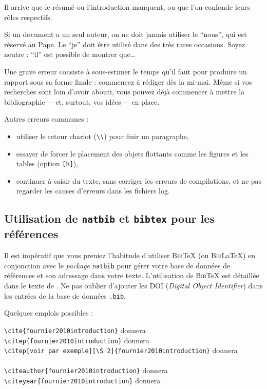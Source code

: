 \documentclass{ipgpmaster}
\begin{document}
Il arrive que le résumé ou l'introduction manquent, ou que l'on confonde 
leurs rôles respectifs.     

Si un document a un seul auteur, on ne doit jamais utiliser le ``nous'',  
qui est réservé au Pape. Le ``je'' doit être utilisé dans des très 
rares occasions. Soyez neutre : ``il'' est possible de montrer que\dots 

Une grave erreur consiste à sous-estimer le temps qu'il faut pour
 produire un rapport sous sa forme finale : commencez à rédiger dès la mi-mai.
Même si vos recherches sont loin d'avoir abouti, vous pouvez déjà commencer
 à mettre la bibliographie ---\,et, surtout, vos idées\,--- en place.
 
 
 Autres erreurs communes :
\begin{itemize}
\item utiliser le retour chariot (\verb"\\") pour finir un paragraphe,
\item essayer de forcer le placement des objets flottants comme les figures et les tables (option \verb"[h]"),
\item continuer à saisir du texte, sans corriger les erreurs de compilations, et ne pas regarder les causes d'erreurs dans les fichiers log.
\end{itemize}



\subsection{Utilisation de \texttt{natbib} et \texttt{bibtex} pour les références}
\label{sec:natbib}
Il est impératif que vous preniez l'habitude d'utiliser \textsc{Bib}\TeX{} (ou \textsc{Bib}\LaTeX{})
en conjonction avec le \textit{package\/} \texttt{natbib} pour gérer votre
 base de données de références et son adressage dans votre texte. L'utilisation de \textsc{Bib}\TeX{} 
est 
 détaillée dans le texte de \cite{moguilny2021introduction}. Ne pas oublier d'ajouter les DOI 
 (\textit{Digital Object Identifier}) dans les entrées de la base de données \texttt{.bib}.

 Quelques emplois possibles :

 \verb"\cite{fournier2010introduction}"  donnera \cite{fournier2010introduction}  \\
 \verb"\citep{fournier2010introduction}" donnera \citep{fournier2010introduction}  \\
 \verb"\citep[voir par exemple][\S 2]{fournier2010introduction}"  donnera \\
 \hspace*{1cm}\citep[voir par exemple][\S 2]{fournier2010introduction}  \\
 \verb"\citeauthor{fournier2010introduction}"  donnera \citeauthor{fournier2010introduction}  \\
 \verb"\citeyear{fournier2010introduction}"  donnera \citeyear{fournier2010introduction}  
\end{document}
